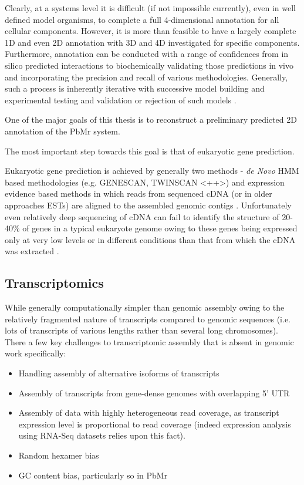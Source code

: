 Clearly, at a systems level it is difficult (if not impossible currently), 
even in well defined model organisms, to complete a full 4-dimensional annotation 
for all cellular components. However, it is more than feasible to have a largely
complete 1D and even 2D annotation with 3D and 4D investigated for specific 
components.  Furthermore, annotation can be conducted with a range of confidences
from in silico predicted interactions to biochemically validating those predictions in vivo
and incorporating the precision and recall of various methodologies. Generally, such a process
is inherently iterative with successive model building and experimental testing and validation 
or rejection of such models \citep{Reed2006}.

One of the major goals of this thesis is to reconstruct a preliminary predicted
2D annotation of the PbMr system.

The most important step towards this goal is that of eukaryotic gene prediction.


Eukaryotic gene prediction is achieved by generally two methods - \textit{de Novo} HMM based
methodologies (e.g. GENESCAN, TWINSCAN \citep{}<++>) and expression evidence based methods
in which reads from sequenced cDNA (or in older approaches ESTs) are aligned to the 
assembled genomic contigs \citep{Brent2007}.  Unfortunately even relatively deep
sequencing of cDNA can fail to identify the structure of 20-40\% of genes in a typical
eukaryote genome owing to these genes being expressed only at very low levels or in
different conditions than that from which the cDNA was extracted \citep{Brent2007}.






\subsection{Transcriptomics}


While generally computationally simpler than genomic assembly \citep{MacManes2014}
owing to the relatively fragmented nature of transcripts compared to genomic 
sequences (i.e. lots of transcripts of various lengths rather than several 
long chromosomes).  There a few key challenges to transcriptomic assembly
that is absent in genomic work specifically:
\begin{itemize}
    \item Handling assembly of alternative isoforms of transcripts \citep{Pyrkosz2013}
    \item Assembly of transcripts from gene-dense genomes with overlapping 5' UTR 
    \item Assembly of data with highly heterogeneous read coverage, as transcript
        expression level is proportional to read coverage (indeed expression analysis
        using RNA-Seq datasets relies upon this fact).
    \item Random hexamer bias
    \item GC content bias, particularly so in PbMr
\end{itemize}

